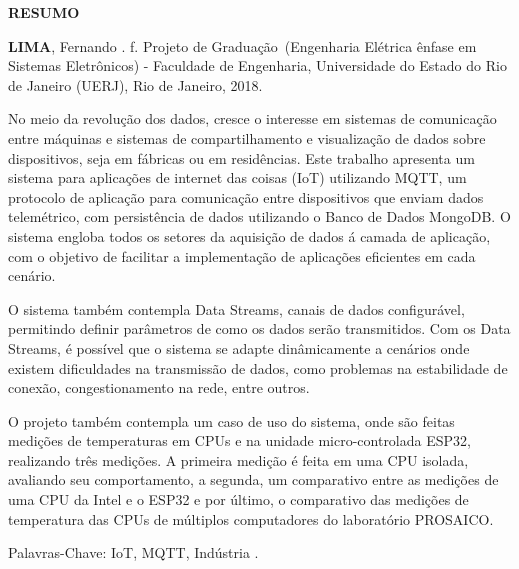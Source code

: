 \begin{center}
\textbf{RESUMO}
\end{center}

%
%


$\!$\\

\hspace{-1.3cm}\textbf{LIMA}, Fernando \textit{\setTitulo}. \pageref{LastPage} f. Projeto de Graduação~(Engenharia Elétrica ênfase em Sistemas Eletrônicos) - Faculdade de Engenharia, Universidade do Estado do Rio de Janeiro (UERJ), Rio de Janeiro, 2018.

\vspace{.2cm}

No meio da revolução dos dados, cresce o interesse em sistemas de comunicação entre máquinas e sistemas de compartilhamento e visualização de dados  sobre dispositivos, seja em fábricas ou em residências. Este trabalho apresenta um sistema para aplicações de internet das coisas (IoT) utilizando MQTT, um protocolo de aplicação para comunicação entre dispositivos que enviam dados telemétrico, com persistência de dados utilizando o Banco de Dados MongoDB. O sistema engloba todos os setores da aquisição de dados á camada de aplicação, com o objetivo de facilitar a implementação de aplicações eficientes em cada cenário.

O sistema também contempla  Data Streams, canais de dados configurável, permitindo definir parâmetros de como os dados serão transmitidos. Com os Data Streams, é possível que o sistema se adapte dinâmicamente a cenários onde existem dificuldades na transmissão de dados, como problemas na estabilidade de conexão, congestionamento na rede, entre outros.

O projeto também contempla um caso de uso do sistema, onde são feitas medições de temperaturas em CPUs e na unidade micro-controlada ESP32, realizando três medições. A primeira medição é feita em uma CPU isolada, avaliando seu comportamento, a segunda, um comparativo entre as medições de uma CPU da Intel e o ESP32 e por último, o comparativo das medições de temperatura das CPUs de múltiplos computadores do laboratório PROSAICO. 



\vspace{1cm}

\hspace{-1.3cm}Palavras-Chave: IoT, MQTT, Indústria .